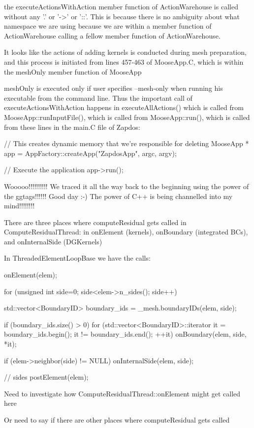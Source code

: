 {the executeActionsWithAction member function of ActionWarehouse is called without any '.' or '->' or '::'. This is because there is no ambiguity about what namespace we are using because we are within a member function of ActionWarehouse calling a fellow member function of ActionWarehouse.

It looks like the actions of adding kernels is conducted during mesh preparation, and this process is initiated from lines 457-463 of MooseApp.C, which is within the meshOnly member function of MooseApp

meshOnly is executed only if user specifies --mesh-only when running his executable from the command line. Thus the important call of executeActionsWithAction happens in executeAllActions() which is called from MooseApp::runInputFile(), which is called from MooseApp::run(), which is called from these lines in the main.C file of Zapdos:

  // This creates dynamic memory that we're responsible for deleting
  MooseApp * app = AppFactory::createApp("ZapdosApp", argc, argv);

  // Execute the application
  app->run();

Wooooo!!!!!!!!!! We traced it all the way back to the beginning using the power of the ggtags!!!!!! Good day :-) The power of C++ is being channelled into my mind!!!!!!!!

There are three places where computeResidual gets called in ComputeResidualThread: in onElement (kernels), onBoundary (integrated BCs), and onInternalSide (DGKernels)

In ThreadedElementLoopBase we have the calls:

      onElement(elem);

      for (unsigned int side=0; side<elem->n_sides(); side++)
      {
        std::vector<BoundaryID> boundary_ids = _mesh.boundaryIDs(elem, side);

        if (boundary_ids.size() > 0)
          for (std::vector<BoundaryID>::iterator it = boundary_ids.begin(); it != boundary_ids.end(); ++it)
            onBoundary(elem, side, *it);

        if (elem->neighbor(side) != NULL)
          onInternalSide(elem, side);
      } // sides
      postElement(elem);

Need to investigate how ComputeResidualThread::onElement might get called here

Or need to say if there are other places where computeResidual gets called

}

